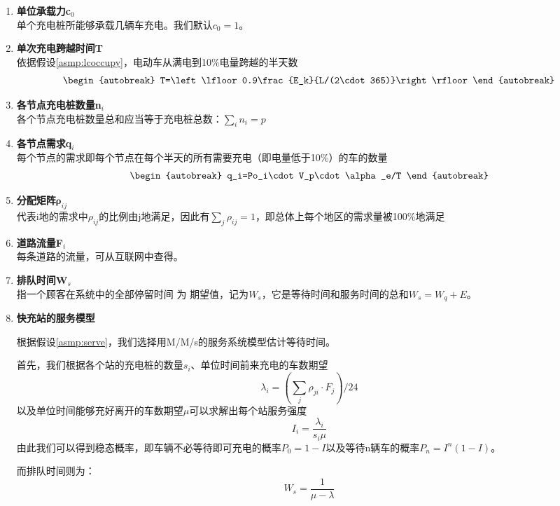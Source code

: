 \documentclass[12pt, a4paper, oneside]{ctexart}
\begin{document}
\begin{enumerate}[label = \alph*)]
    \item \textbf{单位承载力c\(_0\)}\\
          单个充电桩所能够承载几辆车充电。我们默认\(c_0=1\)。
    \item \textbf{单次充电跨越时间T}\\
          依据假设\ref{asmp:lcoccupy}，电动车从满电到10\%电量跨越的半天数\begin{align}\begin{autobreak}
                  T=\left\lfloor 0.9\frac{E_k}{L/(2\cdot 365)}\right\rfloor
              \end{autobreak}\end{align}
    \item \textbf{各节点充电桩数量n\(_i\)}\\
          各个节点充电桩数量总和应当等于充电桩总数：\(\sum\limits_i n_i=p \)
    \item \textbf{各节点需求q\(_i\)}\\
          每个节点的需求即每个节点在每个半天的所有需要充电（即电量低于10\%）的车的数量\begin{align}\begin{autobreak}
                  q_i=Po_i\cdot V_p\cdot\alpha_e/T
              \end{autobreak}\end{align}
    \item \textbf{分配矩阵\(\boldsymbol{\rho}_{ij}\)}\\
          代表i地的需求中\(\rho_{ij}\)的比例由j地满足，因此有\(\sum\limits_j \rho_{ij}=1\)，即总体上每个地区的需求量被100\%地满足
    \item \textbf{道路流量F\(_i\)}\\
          每条道路的流量，可从互联网中查得。
    \item \textbf{排队时间W\(_s\)}\\
          指一个顾客在系统中的全部停留时间 为 期望值，记为\(W_s\)，它是等待时间和服务时间的总和\(W_s=W_q+E\)。
    \item \textbf{快充站的服务模型}
    
        根据假设\ref{asmp:serve}，我们选择用M/M/s的服务系统模型估计等待时间。

        首先，我们根据各个站的充电桩的数量\(s_i\)、单位时间前来充电的车数期望
        \begin{dmath}
            \lambda_i=(\sum\limits_j\rho_{ji}\cdot F_j)/24
        \end{dmath}
        以及单位时间能够充好离开的车数期望\(\mu\)可以求解出每个站服务强度
        \begin{dmath}
            I_i=\frac{\lambda_i}{s_i\mu}
        \end{dmath}
        由此我们可以得到稳态概率，即车辆不必等待即可充电的概率\(P_0=1-I\)以及等待n辆车的概率\(P_n=I^n(1-I)\)。

        而排队时间则为：
        \begin{dmath}
            W_s=\frac{1}{\mu-\lambda}
        \end{dmath}
\end{enumerate}
\end{document}
